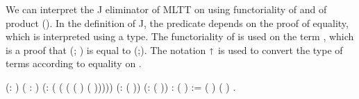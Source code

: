 We can interpret the J eliminator of MLTT on  using functoriality of  and of product (). In the definition of J, the predicate  depends on the proof of equality, which is interpreted using a  type. The functoriality of  is used on the term    \coqdocvariable{$\gamma$}, which is a proof that (; ) is equal to (;). The notation $\shortuparrow$  is used to convert the type of terms according to equality on \coqdocdefinition{$\Lambda$}. \begin{coqdoccode}
\coqdocemptyline
\coqdocnoindent
{}   (: ) ( : ) (: ( (\coqdocdefinition{$\Lambda$} ( ( \coqdocnotation{$\circ$} ) ( )))))\coqdoceol
\coqdocindent{7.50em}
(: (  )) (: (\coqdocnotation{\{\{} \coqdocnotation{$\shortuparrow$} \coqdocnotation{(} \coqdocnotation{)}\coqdocnotation{\}\}})) \coqdoceol
\coqdocindent{1.00em}
:  (\coqdocnotation{\{\{} \coqdocnotation{$\shortuparrow$}\coqdocnotation{\}\}}) :=  \coqdocnotation{(} \coqdocvar{$\gamma$}  ( \coqdocnotation{$\star$} \coqdocvariable{$\gamma$}) (   \coqdocvariable{$\gamma$})\coqdocnotation{;}  \coqdocvar{\_} \coqdocvar{\_}\coqdocnotation{)} \coqdocnotation{$\star$} .\coqdoceol
\coqdocemptyline
\end{coqdoccode}

